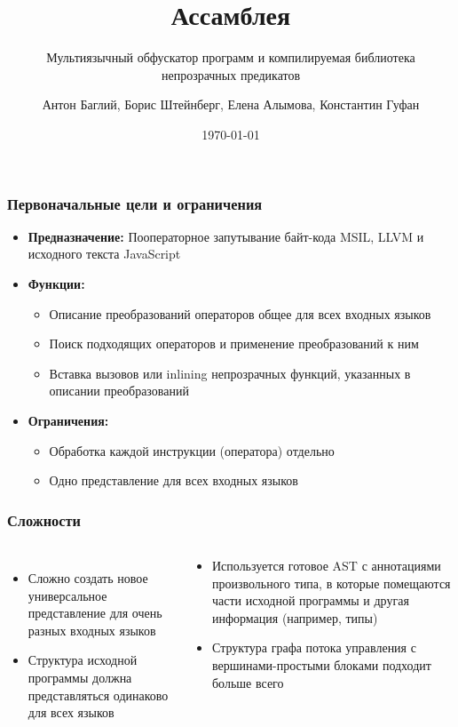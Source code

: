 \documentclass[10pt]{beamer}
\title{Ассамблея}
\subtitle{Мультиязычный обфускатор программ и компилируемая библиотека непрозрачных предикатов}
\date{\today}
\author{Антон Баглий, Борис Штейнберг, Елена Алымова, Константин Гуфан}
\institute{ЮФУ, ФГАНУ Спецвузавтоматика}
\begin{document}
\begingroup
{} 
\begin{frame}
  \titlepage
\end{frame}
\endgroup


\begin{frame}
\frametitle{Первоначальные цели и ограничения}
\begin{itemize}
  \item \textbf{Предназначение:} Пооператорное запутывание байт-кода MSIL, LLVM и исходного текста JavaScript
  \item \textbf{Функции:} 
  \begin{itemize}
    \item Описание преобразований операторов общее для всех входных языков 
    \item Поиск подходящих операторов и применение преобразований к ним
    \item Вставка вызовов или inlining непрозрачных функций, указанных в описании преобразований
  \end{itemize}
  \item \textbf{Ограничения:} 
  \begin{itemize}
    \item Обработка каждой инструкции (оператора) отдельно
    \item Одно представление для всех входных языков
  \end{itemize}
\end{itemize}
\end{frame}

\begin{frame}
\frametitle{Сложности}

\begin{columns}
 
\begin{itemize}
\item Сложно создать новое универсальное представление для очень разных входных языков
\item Структура исходной программы должна представляться одинаково для всех языков
\end{itemize}
 
\begin{tcolorbox}[colback=green!5,colframe=green!40!black,title=решения]
\begin{itemize}
\item Используется готовое AST с аннотациями произвольного типа, в которые помещаются части исходной программы
и другая информация (например, типы)
\item Структура графа потока управления с вершинами-простыми блоками подходит больше всего
\end{itemize}
\end{tcolorbox}
\end{columns}

\end{frame}
\end{document}
